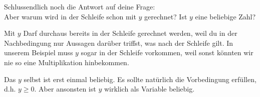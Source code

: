 \documentclass[ngerman,a4paper, 11pt]{article}
\begin{document}
	Schlussendlich noch die Antwort auf deine Frage: \\ 
	Aber warum wird in der Schleife schon mit $y$ gerechnet? Ist $y$ eine beliebige Zahl?
	
	Mit $y$ Darf durchaus bereits in der Schleife gerechnet werden, weil du in der Nachbedingung nur Aussagen darüber triffst, was nach der Schleife gilt. In unserem Beispiel muss $y$ sogar in der Schleife vorkommen, weil sonst könnten wir nie so eine Multiplikation hinbekommen. 
	
	Das $y$ selbst ist erst einmal beliebig. Es sollte natürlich die Vorbedingung erfüllen, d.h. $y \ge 0$. Aber ansonsten ist $y$ wirklich als Variable beliebig.
	
	
\end{document}
